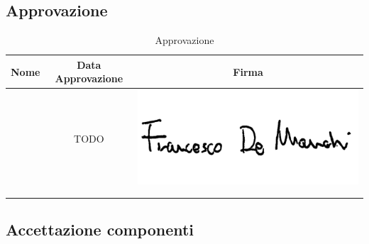 \subsection{Approvazione}

\renewcommand{\arraystretch}{1}
	\begin{table}[H]
		\begin{center}
			\setlength{\aboverulesep}{0pt}
			\setlength{\belowrulesep}{0pt}
			\setlength{\extrarowheight}{.75ex}
			\begin{tabular}{ c c c}
				\rowcolor{AzzurroGruppo!30} 
				\textbf{Nome} & \textbf{Data Approvazione} & \textbf{Firma} \\
				\toprule
				
				\Francesco{} & TODO & \includegraphics[scale = 0.16]{components/img/firme_membri/firma-fdm.png} \\
				\Tullio{} & & \\
				\Riccardo{} & & \\
				
				\bottomrule
			\end{tabular}
			\caption{Approvazione}
		\end{center}
    \end{table}

\subsection{Accettazione componenti}

